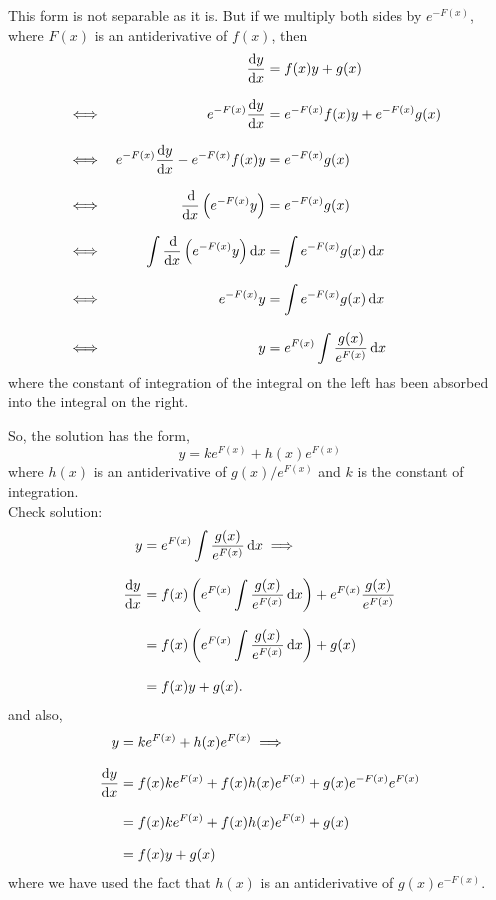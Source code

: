 \documentclass[../MathsNotesBase.tex]{subfiles}
\begin{document}
{		\bigskip\bigskip
		This form is not separable as it is. But if we multiply both sides by $e^{-F(x)}$, where $F(x)$ is an antiderivative of $f(x)$, then
		\begin{align*}
		&& \frac{\dif y}{\dif x} &= f(x)y + g(x) \\[8pt]
		&\iff & e^{-F(x)}\frac{\dif y}{\dif x} &= e^{-F(x)}f(x)y + e^{-F(x)}g(x) &\sidecomment{} \\[8pt]
		&\iff & e^{-F(x)}\frac{\dif y}{\dif x} - e^{-F(x)}f(x)y &= e^{-F(x)}g(x) &\sidecomment{} \\[8pt]
		&\iff & \frac{\dif}{\dif x} \left(e^{-F(x)}y\right) &= e^{-F(x)}g(x) &\sidecomment{} \\[8pt]
		&\iff & \int \frac{\dif}{\dif x} \left(e^{-F(x)}y\right) \dif x &= \int e^{-F(x)}g(x) \dif x &\sidecomment{} \\[8pt]
		&\iff & e^{-F(x)}y &= \int e^{-F(x)}g(x) \dif x \\[8pt]
		&\iff & y &= e^{F(x)}\int \frac{g(x)}{e^{F(x)}} \dif x
		\end{align*}
		where the constant of integration of the integral on the left has been absorbed into the integral on the right.\\
		
		
		\medskip
		So, the solution has the form,
		\[ y = k e^{F(x)} + h(x) e^{F(x)} \]
		where $h(x)$ is an antiderivative of ${ g(x)/e^{F(x)} }$ and $k$ is the constant of integration.\\
		
		Check solution:
		\begin{align*}
			y &= e^{F(x)}\int \frac{g(x)}{e^{F(x)}} \dif x \implies \\[8pt]
			\frac{\dif y}{\dif x} &= f(x)\left(e^{F(x)}\int \frac{g(x)}{e^{F(x)}} \dif x\right) + e^{F(x)}\frac{g(x)}{e^{F(x)}} \\[8pt]
			&= f(x)\left(e^{F(x)}\int \frac{g(x)}{e^{F(x)}} \dif x\right) + g(x) \\[8pt]
			&= f(x)y + g(x).
		\end{align*}
		and also,
		\begin{align*}
			y &= k e^{F(x)} + h(x) e^{F(x)} \implies \\[8pt]
			\frac{\dif y}{\dif x} &= f(x) k e^{F(x)} + f(x) h(x) e^{F(x)} + g(x) e^{-F(x)} e^{F(x)} \\[8pt]
			&= f(x) k e^{F(x)} + f(x) h(x) e^{F(x)} + g(x) \\[8pt]
			&= f(x)y + g(x)
		\end{align*}
		where we have used the fact that $h(x)$ is an antiderivative of ${ g(x) e^{-F(x)} }$.
		
}
\end{document}
